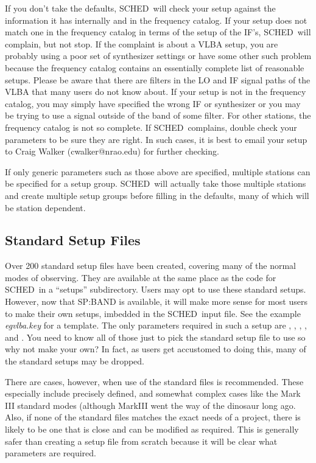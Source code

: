 \documentclass{report}
\newcommand{\schedb}{{\sc SCHED~}}
\begin{document}
If you don't take the defaults, \schedb will check your setup against
the information it has internally and in the frequency catalog.  If
your setup does not match one in the frequency catalog in terms of the
setup of the IF's, \schedb will complain, but not stop.  If the
complaint is about a VLBA setup, you are probably using a poor set of
synthesizer settings or have some other such problem because the
frequency catalog contains an essentially complete list of reasonable
setups.  Please be aware that there are filters in the LO and IF
signal paths of the VLBA that many users do not know about.  If your
setup is not in the frequency catalog, you may simply have specified
the wrong IF or synthesizer or you may be trying to use a signal
outside of the band of some filter.  For other stations, the frequency
catalog is not so complete.  If \schedb complains, double check your
parameters to be sure they are right.  In such cases, it is best to
email your setup to Craig Walker (cwalker@nrao.edu) for further
checking.

If only generic parameters such as those above are specified,
multiple stations can be specified for a setup group.  \schedb will
actually take those multiple stations and create multiple setup
groups before filling in the defaults, many of which will be
station dependent.

\subsection{\label{SSEC:SETSTD}Standard Setup Files}

Over 200 standard setup files have been created, covering many of the
normal modes of observing.  They are available at the same place as
the code for \schedb in a ``setups'' subdirectory.  Users may opt
to use these standard setups.  However, now that 
{SP:BAND} is available, it will make more sense for most users
to make their own setups, imbedded in the \schedb input file.  See
the example {\sl egvlba.key} for a template.  The only parameters
required in such a setup are ,
, ,
, and .
You need to know all of those just to pick the standard setup file
to use so why not make your own?  In fact, as users get accustomed
to doing this, many of the standard setups may be dropped.

There are cases, however, when use of the standard files is
recommended.  These especially include precisely defined, and somewhat
complex cases like the Mark III standard modes (although MarkIII went
the way of the dinosaur long ago.  Also, if none of the standard files
matches the exact needs of a project, there is likely to be one that
is close and can be modified as required.  This is generally safer
than creating a setup file from scratch because it will be clear what
parameters are required.
\end{document}
